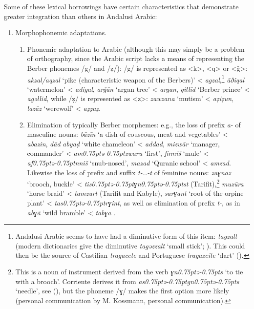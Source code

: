 \documentclass[output=paper,modfonts,nonflat]{langsci/langscibook}
\begin{document}
Some of these lexical borrowings have certain characteristics that demonstrate greater integration than others in Andalusi Arabic: 

\begin{enumerate}
\item Morphophonemic adaptations.

\begin{enumerate}
\item Phonemic adaptation to Arabic (although this may simply be a problem of orthography, since the Arabic script lacks a means of representing the Berber phonemes /g/ and /ẓ/): /g/ is represented as <k>, <q> or <ǧ>: \textit{akzal/aqzal} ‘pike (characteristic weapon of the Berbers)’ < \textit{agzal},\footnote{Andalusi Arabic seems to have had a diminutive form of this item: \textit{tagzalt} (modern dictionaries give the diminutive \textit{tagǝzzalt} ‘small stick’; \citealt{Taïfi1991}). This could then be the source of Castilian \textit{tragacete} and Portuguese \textit{tragazeite} ‘dart’ (\citealt{CorrientePereiraVicenteforthcoming}).}  \textit{āðiqal} ‘watermelon’ < \textit{adigal}, \textit{arǧān} ‘argan tree’ < \textit{argan}, \textit{qillīd} ‘Berber prince’ < \textit{agǝllid}, while /ẓ/ is represented as <z>: \textit{zawzana} ‘mutism’ < \textit{aẓiẓun}, \textit{lazāz} ‘werewolf’ < \textit{aẓẓaẓ}. 

\item Elimination of typically Berber morphemes: e.g., the loss of prefix \textit{a-} of masculine nouns: \textit{bāzīn} ‘a dish of couscous, meat and vegetables’ < \textit{abazin}, \textit{dād} \textit{abyaḍ} ‘white chameleon’ < \textit{addad}, \textit{mizwār} ‘manager, commander’ < \textit{am\kern 0.75ptǝ\kern -0.75ptzwaru} ‘first’, \textit{finniš} `mule' < \textit{af\kern 0.75ptǝ\kern -0.75ptnniš} `snub-nosed', \textit{mazad} ‘Quranic school’ < \textit{amzad}. Likewise the loss of prefix and suffix \textit{t-…-t} of feminine nouns: \textit{zaɣnaz} ‘brooch, buckle’ < \textit{tis\kern 0.75ptǝ\kern -0.75ptɣn\kern 0.75ptǝ\kern -0.75ptst} (Tarifit),\footnote{This is a noun of instrument derived from the verb \textit{ɣn\kern 0.75ptǝ\kern -0.75pts} ‘to tie with a brooch’. Corriente derives it from \textit{as\kern 0.75ptǝ\kern -0.75ptgn\kern 0.75ptǝ\kern -0.75pts} ‘needle’, see (\citealt{CorrientePereiraVicenteforthcoming}), but the phoneme /ɣ/ makes the first option more likely (personal communication by M. Kossmann, personal communication).} \textit{muzūra} ‘horse braid’ < \textit{tamzurt} (Tarifit and Kabyle), \textit{sarɣant} ‘root of the orpine plant’ < \textit{tas\kern 0.75ptǝ\kern -0.75ptrɣint}, as well as elimination of prefix \textit{t-}, as in \textit{abɣā} ‘wild bramble’ < \textit{tabɣa} . 
\end{enumerate}


\end{enumerate}
\end{document}
